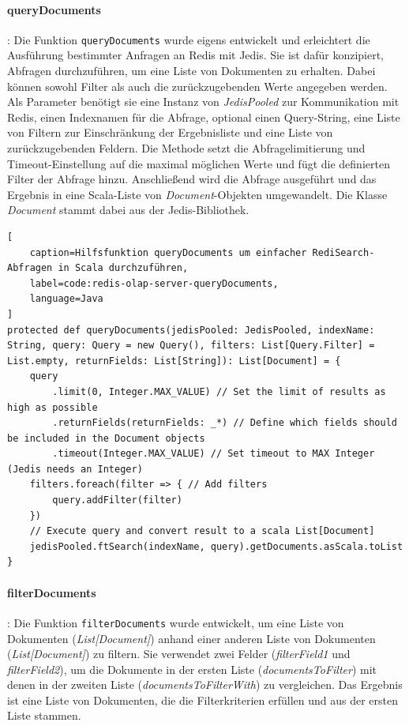 \paragraph{queryDocuments}: Die Funktion \lstinline|queryDocuments| wurde eigens entwickelt und erleichtert die Ausführung bestimmter Anfragen an Redis mit Jedis. Sie ist dafür konzipiert, Abfragen durchzuführen, um eine Liste von Dokumenten zu erhalten. Dabei können sowohl Filter als auch die zurückzugebenden Werte angegeben werden. Als Parameter benötigt sie eine Instanz von \emph{JedisPooled} zur Kommunikation mit Redis, einen Indexnamen für die Abfrage, optional einen Query-String, eine Liste von Filtern zur Einschränkung der Ergebnisliste und eine Liste von zurückzugebenden Feldern. Die Methode setzt die Abfragelimitierung und Timeout-Einstellung auf die maximal möglichen Werte und fügt die definierten Filter der Abfrage hinzu. Anschließend wird die Abfrage ausgeführt und das Ergebnis in eine Scala-Liste von \emph{Document}-Objekten umgewandelt. Die Klasse \emph{Document} stammt dabei aus der Jedis-Bibliothek.

\begin{lstlisting}[
    caption=Hilfsfunktion queryDocuments um einfacher RediSearch-Abfragen in Scala durchzuführen,
    label=code:redis-olap-server-queryDocuments,
    language=Java
]
protected def queryDocuments(jedisPooled: JedisPooled, indexName: String, query: Query = new Query(), filters: List[Query.Filter] = List.empty, returnFields: List[String]): List[Document] = {
	query
		.limit(0, Integer.MAX_VALUE) // Set the limit of results as high as possible
		.returnFields(returnFields: _*) // Define which fields should be included in the Document objects
		.timeout(Integer.MAX_VALUE) // Set timeout to MAX Integer (Jedis needs an Integer)
	filters.foreach(filter => { // Add filters
		query.addFilter(filter)
	})
	// Execute query and convert result to a scala List[Document]
	jedisPooled.ftSearch(indexName, query).getDocuments.asScala.toList
}
\end{lstlisting}

\paragraph{filterDocuments}: Die Funktion \lstinline|filterDocuments| wurde entwickelt, um eine Liste von Dokumenten (\emph{List[Document]}) anhand einer anderen Liste von Dokumenten (\emph{List[Document]}) zu filtern. Sie verwendet zwei Felder (\emph{filterField1} und \emph{filterField2}), um die Dokumente in der ersten Liste (\emph{documentsToFilter}) mit denen in der zweiten Liste (\emph{documentsToFilterWith}) zu vergleichen. Das Ergebnis ist eine Liste von Dokumenten, die die Filterkriterien erfüllen und aus der ersten Liste stammen.

